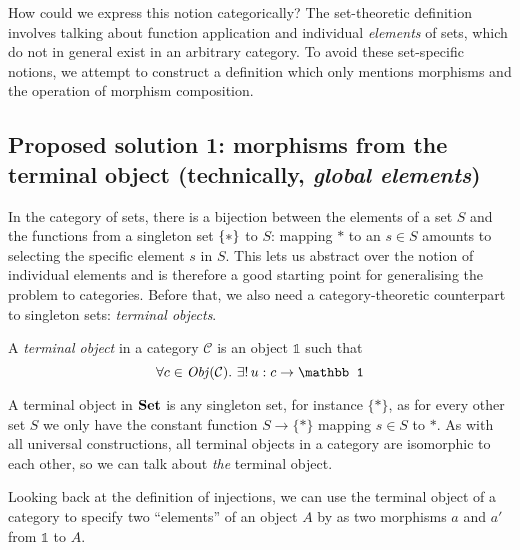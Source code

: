 How could we express this notion categorically? The set-theoretic definition
involves talking about function application and individual \emph{elements} of
sets, which do not in general exist in an arbitrary category. To avoid these
set-specific notions, we attempt to construct a definition which only mentions
morphisms and the operation of morphism composition.

\subsection{Proposed solution 1: morphisms from the terminal object
  (technically, \emph{global elements})}

In the category of sets, there is a bijection between the elements of a set
$S$ and the functions from a singleton set $\{ * \}$ to $S$: mapping $*$ to
an $s \in S$ amounts to selecting the specific element $s$ in $S$. This lets
us abstract over the notion of individual elements and is therefore a good
starting point for generalising the problem to categories. Before that, we
also need a category-theoretic counterpart to singleton sets: 
\emph{terminal objects}.

\begin{definition}
A \emph{terminal object} in a category $\mathcal C$ is an object $\mathbb 1$
such that
\begin{equation*}
    \forall c \in \Ob(\mathcal C).\ \exists!\, u : c \rightarrow \mathbb 1
\end{equation*}
\end{definition}

A terminal object in $\mathbf {Set}$ is any singleton set, for instance $\{*\}$, as
for every other set $S$ we only have the constant function 
$S \rightarrow \{*\}$ mapping $s \in S$ to $*$.
As with all universal constructions, all terminal objects in a category are
isomorphic to each other, so we can talk about \emph{the} terminal object.

Looking back at the definition of injections, we can use the terminal object
of a category to specify two ``elements'' of an object $A$ by as two morphisms
$a$ and $a'$ from $\mathbb 1$ to $A$.

\begin{center}
\end{center}

